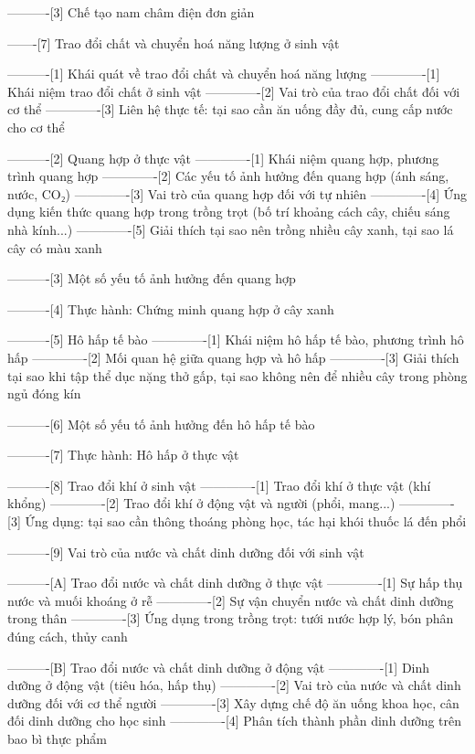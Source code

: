 ----------[3] Chế tạo nam châm điện đơn giản

-------[7] Trao đổi chất và chuyển hoá năng lượng ở sinh vật

----------[1] Khái quát về trao đổi chất và chuyển hoá năng lượng
-------------[1] Khái niệm trao đổi chất ở sinh vật
-------------[2] Vai trò của trao đổi chất đối với cơ thể
-------------[3] Liên hệ thực tế: tại sao cần ăn uống đầy đủ, cung cấp nước cho cơ thể

----------[2] Quang hợp ở thực vật
-------------[1] Khái niệm quang hợp, phương trình quang hợp
-------------[2] Các yếu tố ảnh hưởng đến quang hợp (ánh sáng, nước, CO₂)
-------------[3] Vai trò của quang hợp đối với tự nhiên
-------------[4] Ứng dụng kiến thức quang hợp trong trồng trọt (bố trí khoảng cách cây, chiếu sáng nhà kính...)
-------------[5] Giải thích tại sao nên trồng nhiều cây xanh, tại sao lá cây có màu xanh

----------[3] Một số yếu tố ảnh hưởng đến quang hợp

----------[4] Thực hành: Chứng minh quang hợp ở cây xanh

----------[5] Hô hấp tế bào
-------------[1] Khái niệm hô hấp tế bào, phương trình hô hấp
-------------[2] Mối quan hệ giữa quang hợp và hô hấp
-------------[3] Giải thích tại sao khi tập thể dục nặng thở gấp, tại sao không nên để nhiều cây trong phòng ngủ đóng kín

----------[6] Một số yếu tố ảnh hưởng đến hô hấp tế bào

----------[7] Thực hành: Hô hấp ở thực vật

----------[8] Trao đổi khí ở sinh vật
-------------[1] Trao đổi khí ở thực vật (khí khổng)
-------------[2] Trao đổi khí ở động vật và người (phổi, mang...)
-------------[3] Ứng dụng: tại sao cần thông thoáng phòng học, tác hại khói thuốc lá đến phổi

----------[9] Vai trò của nước và chất dinh dưỡng đối với sinh vật

----------[A] Trao đổi nước và chất dinh dưỡng ở thực vật
-------------[1] Sự hấp thụ nước và muối khoáng ở rễ
-------------[2] Sự vận chuyển nước và chất dinh dưỡng trong thân
-------------[3] Ứng dụng trong trồng trọt: tưới nước hợp lý, bón phân đúng cách, thủy canh

----------[B] Trao đổi nước và chất dinh dưỡng ở động vật
-------------[1] Dinh dưỡng ở động vật (tiêu hóa, hấp thụ)
-------------[2] Vai trò của nước và chất dinh dưỡng đối với cơ thể người
-------------[3] Xây dựng chế độ ăn uống khoa học, cân đối dinh dưỡng cho học sinh
-------------[4] Phân tích thành phần dinh dưỡng trên bao bì thực phẩm

